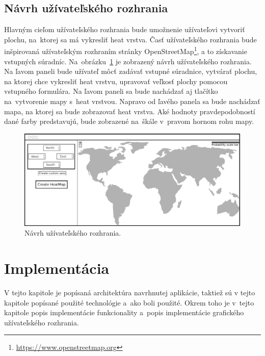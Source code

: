 \section{Návrh užívateľského rozhrania}
Hlavným cieľom užívateľského rozhrania bude umožnenie užívateľovi vytvoriť plochu, na~ktorej sa má vykresliť heat vrstva. Časť užívateľského rozhrania bude inšpirovaná užívateľským rozhraním stránky OpenStreetMap\footnote{\url{https://www.openstreetmap.org}}, a to získavanie vstupných súradníc. Na~obrázku~\ref{fig:ui-mockup} je zobrazený návrh užívateľského rozhrania. Na ľavom paneli bude užívateľ môcť zadávať vstupné súradnice, vytvárať plochu, na ktorej chce vykresliť heat vrstvu, upravovať veľkosť plochy pomocou vstupného formulára. Na ľavom paneli sa bude nachádzať aj tlačítko na~vytvorenie mapy s~heat vrstvou. Napravo od ľavého panela sa bude nachádzať mapa, na ktorej sa bude zobrazovať heat vrstva. Aké hodnoty pravdepodobností dané farby predstavujú, bude zobrazené na~škále v~pravom hornom rohu mapy.

\begin{figure}[ht]
    \centering
    \includegraphics[width=0.98\linewidth]{obrazky-figures/ui-mockup.pdf}
    \caption{Návrh užívateľského rozhrania.}
    \label{fig:ui-mockup}
\end{figure}



\chapter{Implementácia}
\label{chap:implementacia}
V tejto kapitole je popísaná architektúra navrhnutej aplikácie, taktiež sú v tejto kapitole popísané použité technológie a~ako boli použité. Okrem toho je v~tejto kapitole popis implementácie funkcionality a~popis implementácie grafického užívateľského rozhrania.


